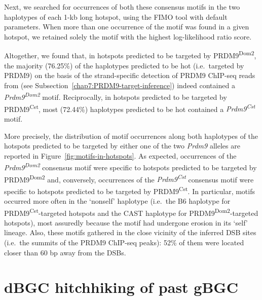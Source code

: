 Next, we searched for occurrences of both these consensus motifs in the two haplotypes of each 1-kb long hotspot, using the FIMO tool \citep{grant2011fimo} with default parameters. 
When more than one occurrence of the motif was found in a given hotspot, we retained solely the motif with the highest log-likelihood ratio score.

Altogether, we found that, in hotspots predicted to be targeted by PRDM9\textsuperscript{Dom2}, the majority (76.25\%) of the haplotypes predicted to be hot (i.e.\ targeted by PRDM9) on the basis of the strand-specific detection of PRDM9 ChIP-seq reads from \citet{baker2015prdm9} (see Subsection~\ref{chap7:PRDM9-target-inference}) indeed contained a \textit{Prdm9\textsuperscript{Dom2}} motif. 
Reciprocally, in hotspots predicted to be targeted by PRDM9\textsuperscript{Cst}, most (72.44\%) haplotypes predicted to be hot contained a \textit{Prdm9\textsuperscript{Cst}} motif.

More precisely, the distribution of motif occurrences along both haplotypes of the hotspots predicted to be targeted by either one of the two \textit{Prdm9} alleles are reported in Figure~\ref{fig:motifs-in-hotspots}.
As expected, occurrences of the \textit{Prdm9\textsuperscript{Dom2}} consensus motif were specific to hotspots predicted to be targeted by PRDM9\textsuperscript{Dom2} and, conversely, occurrences of the \textit{Prdm9\textsuperscript{Cst}} consensus motif were specific to hotspots predicted to be targeted by PRDM9\textsuperscript{Cst}.
In particular, motifs occurred more often in the ‘nonself’ haplotype (i.e.\ the B6 haplotype for PRDM9\textsuperscript{Cst}-targeted hotspots and the CAST haplotype for PRDM9\textsuperscript{Dom2}-targeted hotspots), most assuredly because the motif had undergone erosion in its ‘self’ lineage.
Also, these motifs gathered in the close vicinity of the inferred DSB sites (i.e.\ the summits of the PRDM9 ChIP-seq peaks): 52\% of them were located closer than 60 bp away from the DSBs.




\section{dBGC hitchhiking of past gBGC}


